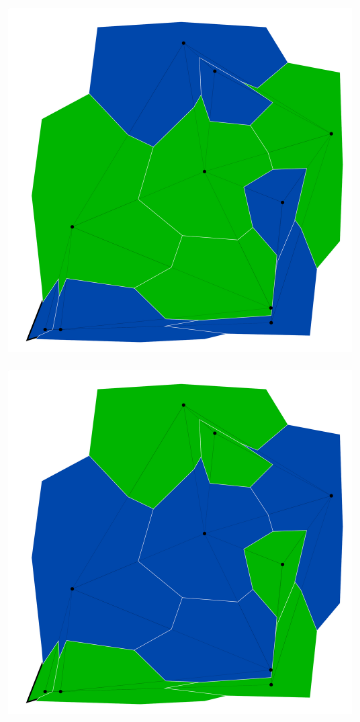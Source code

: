 \documentclass{article}
\begin{document}
\begin{figure}[h!]
\begin{subfigure}{0.18\textwidth}
		\end{subfigure}
		\;
		\\
		\begin{subfigure}{0.18\textwidth}
			\centering
			\includegraphics[width=\textwidth]{images/sequences/genetic/genetic_I00003}
			\caption{}
			
		\end{subfigure}
		\;		
		\begin{subfigure}{0.18\textwidth}
			\centering
			\includegraphics[width=\textwidth]{images/sequences/genetic/genetic_I00004}
			\caption{}
			

\end{subfigure}
\end{figure}
\end{document}
